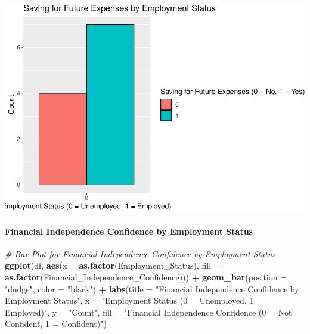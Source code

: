 \documentclass[
]{article}
\newenvironment{Shaded}{\begin{snugshade}}{\end{snugshade}}
\newcommand{\AttributeTok}[1]{\textcolor[rgb]{0.13,0.29,0.53}{#1}}
\newcommand{\CommentTok}[1]{\textcolor[rgb]{0.56,0.35,0.01}{\textit{#1}}}
\newcommand{\FunctionTok}[1]{\textcolor[rgb]{0.13,0.29,0.53}{\textbf{#1}}}
\newcommand{\NormalTok}[1]{#1}
\newcommand{\SpecialCharTok}[1]{\textcolor[rgb]{0.81,0.36,0.00}{\textbf{#1}}}
\newcommand{\StringTok}[1]{\textcolor[rgb]{0.31,0.60,0.02}{#1}}
\begin{document}
\includegraphics{Project1_files/figure-latex/unnamed-chunk-11-1.pdf}

\paragraph{Financial Independence Confidence by Employment
Status}\label{financial-independence-confidence-by-employment-status}

\begin{Shaded}
\begin{Highlighting}[]
\CommentTok{\# Bar Plot for Financial Independence Confidence by Employment Status}
\FunctionTok{ggplot}\NormalTok{(df, }\FunctionTok{aes}\NormalTok{(}\AttributeTok{x =} \FunctionTok{as.factor}\NormalTok{(Employment\_Status), }\AttributeTok{fill =} \FunctionTok{as.factor}\NormalTok{(Financial\_Independence\_Confidence))) }\SpecialCharTok{+}
  \FunctionTok{geom\_bar}\NormalTok{(}\AttributeTok{position =} \StringTok{"dodge"}\NormalTok{, }\AttributeTok{color =} \StringTok{"black"}\NormalTok{) }\SpecialCharTok{+}
  \FunctionTok{labs}\NormalTok{(}\AttributeTok{title =} \StringTok{"Financial Independence Confidence by Employment Status"}\NormalTok{, }\AttributeTok{x =} \StringTok{"Employment Status (0 = Unemployed, 1 = Employed)"}\NormalTok{, }\AttributeTok{y =} \StringTok{"Count"}\NormalTok{, }\AttributeTok{fill =} \StringTok{"Financial Independence Confidence (0 = Not Confident, 1 = Confident)"}\NormalTok{)}
\end{Highlighting}
\end{Shaded}
\end{document}
